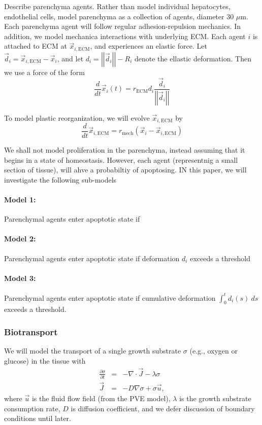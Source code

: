 \documentclass[smallextended,natbib]{svjour3}
\newcommand{\beqa}{\begin{eqnarray}}
\newcommand{\beq}{\begin{equation}}
\newcommand{\eeqa}{\end{eqnarray}}
\newcommand{\eeq}{\end{equation}}
\newcommand{\micron}{\mu\textrm{m}}
\newcommand{\norm}[1]{\left|\left|#1\right|\right|}
\begin{document}
Describe parenchyma agents. Rather than model individual hepatocytes, endothelial cells, model parenchyma as a collection 
of agents, diameter 30 $\micron$. Each parenchyma agent will follow regular adhesion-repulsion mechanics. In addition, we model 
mechanica interactions with underlying ECM. Each agent $i$ is attached to ECM at $\vec{x}_{i,\textrm{ECM}}$, and experiences 
an elastic force. Let $\vec{d}_i = \vec{x}_{i,\textrm{ECM}} - \vec{x}_i $, and let $d_i = \norm{ \vec{d}_i } - R_i$ denote 
the ellastic deformation. Then we use a force of the form 
\beq
\frac{d}{dt} \vec{x}_{i}(t) =r_\textrm{ECM} d_i  \frac{ \vec{d}_i }{ \norm{\vec{d}_i}} 
\eeq

To model plastic reorganization, we will evolve $\vec{x}_{i,\textrm{ECM}}$ by 
\beq
\frac{d}{dt} \vec{x}_{i,\textrm{ECM}} = r_\textrm{mech} \left( \vec{x}_{i} - \vec{x}_{i,\textrm{ECM}} \right)
\eeq

We shall not model proliferation in the parenchyma, instead assuming that it begins in a state of homeostasis. 
However, each agent (representnig a small section of tissue), will ahve a probabiltiy of apoptosing. 
IN this paper, we will investigate the following sub-models 

\paragraph{Model 1:} Parenchymal agents enter apoptotic state if 

\paragraph{Model 2:} Parenchymal agents enter apoptotic state if deformation $d_i$ exceeds a threshold 

\paragraph{Model 3:} Parenchymal agents enter apoptotic state if cumulative deformation 
$\int_0^t d_i(s)\: ds$ exceeds a threshold. 


\subsubsection{Biotransport}
We will model the transport of a single growth substrate $\sigma$ (e.g., oxygen or glucose) 
in the tissue with 
\beqa
\frac{ \partial \sigma }{\partial t} & = & 
-\nabla \cdot \vec{J} - \lambda \sigma \label{eqn:transport1}  \\
\vec{J} &  = & -D \nabla \sigma + \sigma \vec{u} \label{eqn:transport2} , 
\eeqa
where $\vec{u}$ is the fluid flow field (from the PVE model), $\lambda$ is the growth substrate 
consumption rate, $D$ is diffusion coefficient, and we defer discussion of boundary conditions until 
later. 
\end{document}
